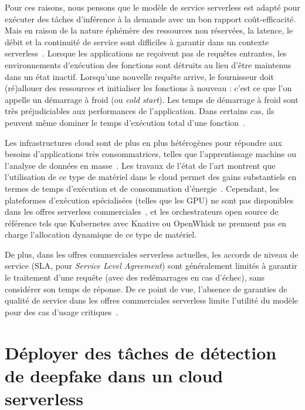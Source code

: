 Pour ces raisons, nous pensons que le modèle de service serverless est adapté pour exécuter des tâches d'inférence à la demande avec un bon rapport coût-efficacité. Mais en raison de la nature éphémère des ressources non réservées, la latence, le débit et la continuité de service sont difficiles à garantir dans un contexte serverless~\cite{vaneykSPECRGCloud2018, dartoisCuckooOpportunisticMapReduce2019}. Lorsque les applications ne reçoivent pas de requêtes entrantes, les environnements d'exécution des fonctions sont détruits au lieu d'être maintenus dans un état inactif. Lorsqu'une nouvelle requête arrive, le fournisseur doit (ré)allouer des ressources et initialiser les fonctions à nouveau : c'est ce que l'on appelle un démarrage à froid (ou \textit{cold start}). Les temps de démarrage à froid sont très préjudiciables aux performances de l'application. Dans certains cas, ils peuvent même dominer le temps d'exécution total d'une fonction~\cite{mullerLambadaInteractiveData2020}.

Les infrastructures cloud sont de plus en plus hétérogènes pour répondre aux besoins d'applications très consommatrices, telles que l'apprentissage machine ou l'analyse de données en masse~\cite{reissHeterogeneityDynamicityClouds}. Les travaux de l'état de l'art montrent que l'utilisation de ce type de matériel dans le cloud permet des gains substantiels en termes de temps d'exécution et de consommation d'énergie~\cite{10.1145/3369583.3392679, 9195730}. Cependant, les plateformes d'exécution spécialisées (telles que les GPU) ne sont pas disponibles dans les offres serverless commerciales~\cite{khandelwalTaureauDeconstructingServerless2020}, et les orchestrateurs open source de référence tels que Kubernetes avec Knative ou OpenWhisk ne prennent pas en charge l'allocation dynamique de ce type de matériel.

De plus, dans les offres commerciales serverless actuelles, les accords de niveau de service (SLA, pour \textit{Service Level Agreement}) sont généralement limités à garantir le traitement d'une requête (avec des redémarrages en cas d'échec), sans considérer son temps de réponse. De ce point de vue, l'absence de garanties de qualité de service dans les offres commerciales serverless limite l'utilité du modèle pour des cas d'usage critiques~\cite{buyyaSLAorientedResourceProvisioning2011}.

\section{Déployer des tâches de détection de deepfake dans un cloud serverless}
\label{section:herofake-deepfake}


